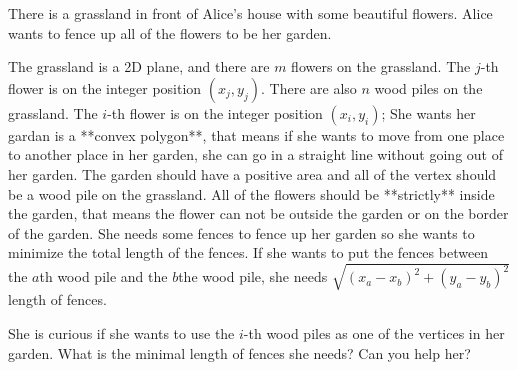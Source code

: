 There is a grassland in front of Alice's house with some beautiful flowers.
Alice wants to fence up all of the flowers to be her garden.

The grassland is a 2D plane, and there are $m$ flowers on the grassland.
The $j$-th flower is on the integer position $(x_j,y_j)$.
There are also $n$  wood piles on the grassland.
The $i$-th flower is on the integer position $(x_i,y_i)$;
She wants her gardan is a **convex polygon**, 
that means if she wants to move from one place to another place in her garden, 
she can go in a straight line without going out of her garden.
The garden should have a positive area and all of the vertex should be a  wood pile on the grassland.
All of the flowers should be **strictly** inside the garden, 
that means the flower can not be outside the garden or on the border of the garden.
She needs some fences to fence up her garden so she wants to minimize the total length of the fences.
If she wants to put the fences between the $a$th  wood pile and the $b$the  wood pile, she needs $\sqrt{(x_a-x_b)^2+(y_a-y_b)^2}$ length of fences.

She is curious if she wants to use the $i$-th  wood piles as one of the vertices in her garden.
What is the minimal length of fences she needs? Can you help her?

